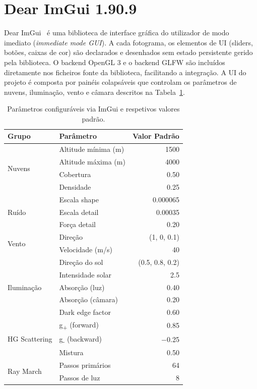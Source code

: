 \section{Dear ImGui 1.90.9}
\label{chap3:sec:imgui}

Dear ImGui~\cite{imgui} é uma biblioteca de interface gráfica do utilizador de modo imediato (\emph{immediate mode GUI}). A cada fotograma, os elementos de UI (sliders, botões, caixas de cor) são declarados e desenhados sem estado persistente gerido pela biblioteca. O backend OpenGL 3 e o backend GLFW são incluídos diretamente nos ficheiros fonte da biblioteca, facilitando a integração. A UI do projeto é composta por painéis colapsáveis que controlam os parâmetros de nuvens, iluminação, vento e câmara descritos na Tabela~\ref{tab:params}.

\begin{table}[H]
\centering
\begin{tabular}{|l|l|r|}
\hline
\textbf{Grupo} & \textbf{Parâmetro} & \textbf{Valor Padrão} \\
\hline\hline
\multirow{4}{*}{Nuvens} & Altitude mínima (m) & 1500 \\
                        & Altitude máxima (m) & 4000 \\
                        & Cobertura           & 0.50 \\
                        & Densidade           & 0.25 \\
\hline
\multirow{3}{*}{Ruído}  & Escala shape        & 0.000065 \\
                        & Escala detail       & 0.00035  \\
                        & Força detail        & 0.20     \\
\hline
\multirow{2}{*}{Vento}  & Direção             & (1, 0, 0.1) \\
                        & Velocidade (m/s)    & 40       \\
\hline
\multirow{5}{*}{Iluminação} & Direção do sol & (0.5, 0.8, 0.2) \\
                             & Intensidade solar & 2.5 \\
                             & Absorção (luz)    & 0.40 \\
                             & Absorção (câmara) & 0.20 \\
                             & Dark edge factor  & 0.60 \\
\hline
\multirow{3}{*}{HG Scattering} & g\textsubscript{+} (forward) & 0.85 \\
                                & g\textsubscript{-} (backward) & $-$0.25 \\
                                & Mistura           & 0.50 \\
\hline
\multirow{2}{*}{Ray March} & Passos primários & 64 \\
                            & Passos de luz   & 8  \\
\hline
\end{tabular}
\caption{Parâmetros configuráveis via ImGui e respetivos valores padrão.}
\label{tab:params}
\end{table}

